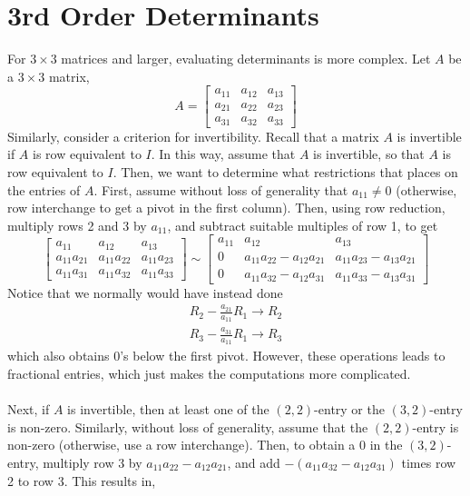 \documentclass[letterpaper,12pt]{article}
\begin{document}
\section*{3rd Order Determinants}
For $3 \times 3$ matrices and larger, evaluating determinants is more complex. Let $A$ be a $3 \times 3$ matrix,
\begin{equation*}
    A = \begin{bmatrix} a_{11} & a_{12} & a_{13} \\
    a_{21} & a_{22} & a_{23} \\
    a_{31} & a_{32} & a_{33} \end{bmatrix}
\end{equation*}
Similarly, consider a criterion for invertibility. Recall that a matrix $A$ is invertible if $A$ is row equivalent to $I$. In this way, assume that $A$ is invertible, so that $A$ is row equivalent to $I$. Then, we want to determine what restrictions that places on the entries of $A$. First, assume without loss of generality that $a_{11} \neq 0$ (otherwise, row interchange to get a pivot in the first column). Then, using row reduction, multiply rows 2 and 3 by $a_{11}$, and subtract suitable multiples of row 1, to get
\begin{equation*}
    \begin{bmatrix} a_{11} & a_{12} & a_{13} \\
    a_{11} a_{21} & a_{11} a_{22} & a_{11} a_{23} \\
    a_{11} a_{31} & a_{11} a_{32} & a_{11} a_{33} \end{bmatrix} \sim \begin{bmatrix} a_{11} & a_{12} & a_{13} \\
    0 & a_{11} a_{22} - a_{12} a_{21} & a_{11} a_{23} - a_{13} a_{21} \\
    0 & a_{11} a_{32} - a_{12} a_{31} & a_{11} a_{33} - a_{13} a_{31} \end{bmatrix}
\end{equation*}
Notice that we normally would have instead done
\begin{align*}
    R_2 -\frac{a_{21}}{a_{11}} R_1 \longrightarrow R_2 \\
    R_3 - \frac{a_{31}}{a_{11}} R_1 \longrightarrow R_3
\end{align*}
which also obtains 0's below the first pivot. However, these operations leads to fractional entries, which just makes the computations more complicated.
\\ \\ Next, if $A$ is invertible, then at least one of the $(2,2)$-entry or the $(3,2)$-entry is non-zero. Similarly, without loss of generality, assume that the $(2,2)$-entry is non-zero (otherwise, use a row interchange). Then, to obtain a 0 in the $(3,2)$-entry, multiply row 3 by $a_{11} a_{22} - a_{12} a_{21}$, and add $-(a_{11} a_{32} - a_{12} a_{31})$ times row 2 to row 3. This results in,
\end{document}
